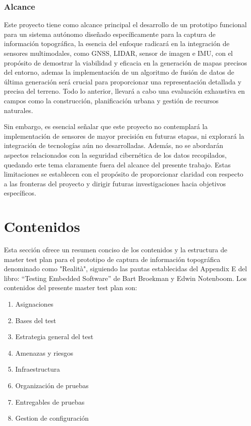 \documentclass[12pt,a4paper, twoside]{article} %
\begin{document}
\subsubsection{Alcance}
\label{subsec:org12e44a2}


Este proyecto tiene como alcance principal el desarrollo de un prototipo funcional para un sistema autónomo diseñado específicamente para la captura de información topográfica, la esencia del enfoque radicará en la integración de sensores multimodales, como GNSS, LIDAR, sensor de imagen e IMU, con el propósito de demostrar la viabilidad y eficacia en la generación de mapas precisos del entorno, ademas la implementación de un algoritmo de fusión de datos de última generación será crucial para proporcionar una representación detallada y precisa del terreno. Todo lo anterior, llevará a cabo una evaluación exhaustiva en campos como la construcción, planificación urbana y gestión de recursos naturales.




Sin embargo, es esencial señalar que este proyecto no contemplará la implementación de sensores de mayor precisión en futuras etapas, ni explorará la integración de tecnologías aún no desarrolladas. Además, no se abordarán aspectos relacionados con la seguridad cibernética de los datos recopilados, quedando este tema claramente fuera del alcance del presente trabajo. Estas limitaciones se establecen con el propósito de proporcionar claridad con respecto a las fronteras del proyecto y dirigir futuras investigaciones hacia objetivos específicos.


\section{Contenidos}
\label{sec:orgc1c4017}

Esta sección ofrece un resumen conciso de los contenidos y la estructura  de master test plan para el prototipo de captura de información topográfica denominado como "Realità", siguiendo las pautas establecidas del Appendix E del libro: “Testing Embedded Software” de Bart Broekman y Edwin Notenboom. Los contenidos del presente master test plan son:


\begin{enumerate}
\item Asignaciones

\item Bases del test

\item Estrategia general del test

\item Amenazas y riesgos

\item Infraestructura

\item Organización de pruebas

\item Entregables de pruebas

\item Gestion de configuración

\end{enumerate}
\end{document}
